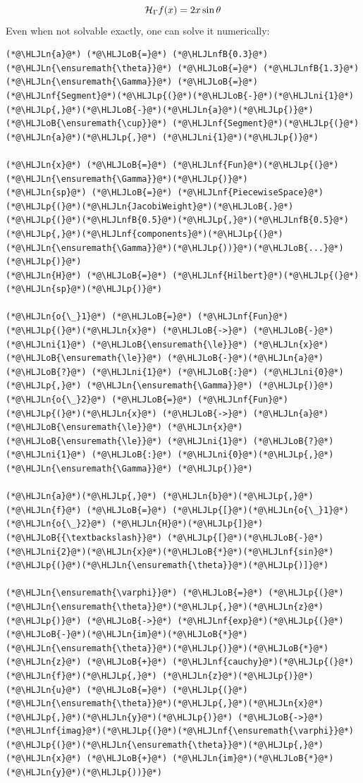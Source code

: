 \documentclass[12pt,a4paper]{article}
\newcommand{\HLJLn}[1]{#1}
\newcommand{\HLJLnf}[1]{\textcolor[RGB]{66,102,213}{#1}}
\newcommand{\HLJLnfB}[1]{\textcolor[RGB]{59,151,46}{#1}}
\newcommand{\HLJLni}[1]{\textcolor[RGB]{59,151,46}{#1}}
\newcommand{\HLJLoB}[1]{\textcolor[RGB]{102,102,102}{\textbf{#1}}}
\newcommand{\HLJLp}[1]{#1}
\def\HH{ {\cal H} }
\begin{document}
\[
\HH_\Gamma f(x) = 2 x  \sin \theta
\]
Even when not solvable exactly, one can solve it numerically:


\begin{lstlisting}
(*@\HLJLn{a}@*) (*@\HLJLoB{=}@*) (*@\HLJLnfB{0.3}@*)
(*@\HLJLn{\ensuremath{\theta}}@*) (*@\HLJLoB{=}@*) (*@\HLJLnfB{1.3}@*)
(*@\HLJLn{\ensuremath{\Gamma}}@*) (*@\HLJLoB{=}@*) (*@\HLJLnf{Segment}@*)(*@\HLJLp{(}@*)(*@\HLJLoB{-}@*)(*@\HLJLni{1}@*)(*@\HLJLp{,}@*)(*@\HLJLoB{-}@*)(*@\HLJLn{a}@*)(*@\HLJLp{)}@*) (*@\HLJLoB{\ensuremath{\cup}}@*) (*@\HLJLnf{Segment}@*)(*@\HLJLp{(}@*)(*@\HLJLn{a}@*)(*@\HLJLp{,}@*) (*@\HLJLni{1}@*)(*@\HLJLp{)}@*)

(*@\HLJLn{x}@*) (*@\HLJLoB{=}@*) (*@\HLJLnf{Fun}@*)(*@\HLJLp{(}@*)(*@\HLJLn{\ensuremath{\Gamma}}@*)(*@\HLJLp{)}@*)
(*@\HLJLn{sp}@*) (*@\HLJLoB{=}@*) (*@\HLJLnf{PiecewiseSpace}@*)(*@\HLJLp{(}@*)(*@\HLJLn{JacobiWeight}@*)(*@\HLJLoB{.}@*)(*@\HLJLp{(}@*)(*@\HLJLnfB{0.5}@*)(*@\HLJLp{,}@*)(*@\HLJLnfB{0.5}@*)(*@\HLJLp{,}@*)(*@\HLJLnf{components}@*)(*@\HLJLp{(}@*)(*@\HLJLn{\ensuremath{\Gamma}}@*)(*@\HLJLp{))}@*)(*@\HLJLoB{...}@*)(*@\HLJLp{)}@*)
(*@\HLJLn{H}@*) (*@\HLJLoB{=}@*) (*@\HLJLnf{Hilbert}@*)(*@\HLJLp{(}@*)(*@\HLJLn{sp}@*)(*@\HLJLp{)}@*)

(*@\HLJLn{o{\_}1}@*) (*@\HLJLoB{=}@*) (*@\HLJLnf{Fun}@*)(*@\HLJLp{(}@*)(*@\HLJLn{x}@*) (*@\HLJLoB{->}@*) (*@\HLJLoB{-}@*)(*@\HLJLni{1}@*) (*@\HLJLoB{\ensuremath{\le}}@*) (*@\HLJLn{x}@*) (*@\HLJLoB{\ensuremath{\le}}@*) (*@\HLJLoB{-}@*)(*@\HLJLn{a}@*) (*@\HLJLoB{?}@*) (*@\HLJLni{1}@*) (*@\HLJLoB{:}@*) (*@\HLJLni{0}@*)(*@\HLJLp{,}@*) (*@\HLJLn{\ensuremath{\Gamma}}@*) (*@\HLJLp{)}@*)
(*@\HLJLn{o{\_}2}@*) (*@\HLJLoB{=}@*) (*@\HLJLnf{Fun}@*)(*@\HLJLp{(}@*)(*@\HLJLn{x}@*) (*@\HLJLoB{->}@*) (*@\HLJLn{a}@*) (*@\HLJLoB{\ensuremath{\le}}@*) (*@\HLJLn{x}@*) (*@\HLJLoB{\ensuremath{\le}}@*) (*@\HLJLni{1}@*) (*@\HLJLoB{?}@*) (*@\HLJLni{1}@*) (*@\HLJLoB{:}@*) (*@\HLJLni{0}@*)(*@\HLJLp{,}@*) (*@\HLJLn{\ensuremath{\Gamma}}@*) (*@\HLJLp{)}@*)

(*@\HLJLn{a}@*)(*@\HLJLp{,}@*) (*@\HLJLn{b}@*)(*@\HLJLp{,}@*) (*@\HLJLn{f}@*) (*@\HLJLoB{=}@*) (*@\HLJLp{[}@*)(*@\HLJLn{o{\_}1}@*) (*@\HLJLn{o{\_}2}@*) (*@\HLJLn{H}@*)(*@\HLJLp{]}@*) (*@\HLJLoB{{\textbackslash}}@*) (*@\HLJLp{[}@*)(*@\HLJLoB{-}@*)(*@\HLJLni{2}@*)(*@\HLJLn{x}@*)(*@\HLJLoB{*}@*)(*@\HLJLnf{sin}@*)(*@\HLJLp{(}@*)(*@\HLJLn{\ensuremath{\theta}}@*)(*@\HLJLp{)]}@*)

(*@\HLJLn{\ensuremath{\varphi}}@*) (*@\HLJLoB{=}@*) (*@\HLJLp{(}@*)(*@\HLJLn{\ensuremath{\theta}}@*)(*@\HLJLp{,}@*)(*@\HLJLn{z}@*)(*@\HLJLp{)}@*) (*@\HLJLoB{->}@*) (*@\HLJLnf{exp}@*)(*@\HLJLp{(}@*)(*@\HLJLoB{-}@*)(*@\HLJLn{im}@*)(*@\HLJLoB{*}@*)(*@\HLJLn{\ensuremath{\theta}}@*)(*@\HLJLp{)}@*)(*@\HLJLoB{*}@*)(*@\HLJLn{z}@*) (*@\HLJLoB{+}@*) (*@\HLJLnf{cauchy}@*)(*@\HLJLp{(}@*)(*@\HLJLn{f}@*)(*@\HLJLp{,}@*) (*@\HLJLn{z}@*)(*@\HLJLp{)}@*)
(*@\HLJLn{u}@*) (*@\HLJLoB{=}@*) (*@\HLJLp{(}@*)(*@\HLJLn{\ensuremath{\theta}}@*)(*@\HLJLp{,}@*)(*@\HLJLn{x}@*)(*@\HLJLp{,}@*)(*@\HLJLn{y}@*)(*@\HLJLp{)}@*) (*@\HLJLoB{->}@*) (*@\HLJLnf{imag}@*)(*@\HLJLp{(}@*)(*@\HLJLnf{\ensuremath{\varphi}}@*)(*@\HLJLp{(}@*)(*@\HLJLn{\ensuremath{\theta}}@*)(*@\HLJLp{,}@*) (*@\HLJLn{x}@*) (*@\HLJLoB{+}@*) (*@\HLJLn{im}@*)(*@\HLJLoB{*}@*)(*@\HLJLn{y}@*)(*@\HLJLp{))}@*)


\end{lstlisting}
\end{document}
